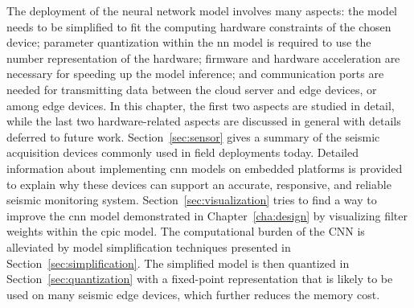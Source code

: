 \documentclass{article}
\begin{document}
\doublespacing

The deployment of the neural network model involves many aspects: the model needs to be simplified to fit the computing hardware constraints of the chosen device; parameter quantization within the \gls{nn} model is required to use the number representation of the hardware; firmware and hardware acceleration are necessary for speeding up the model inference; and communication ports are needed for transmitting data between the cloud server and edge devices, or among edge devices.
In this chapter, the first two aspects are studied in detail, while the last two hardware-related aspects are discussed in general with details deferred to future work.
Section~\ref{sec:sensor} gives a summary of the seismic acquisition devices commonly used in field deployments today.
Detailed information about implementing \gls{cnn} models on embedded platforms is provided to explain why these devices can support an accurate, responsive, and reliable seismic monitoring system.
Section~\ref{sec:visualization} tries to find a way to improve the \gls{cnn} model demonstrated in Chapter~\ref{cha:design} by visualizing filter weights within the \gls{cpic} model.
The computational burden of the CNN is alleviated by model simplification techniques presented in Section~\ref{sec:simplification}.
The simplified model is then quantized in Section~\ref{sec:quantization} with a fixed-point representation that is likely to be used on many seismic edge devices, which further reduces the memory cost.
\end{document}
